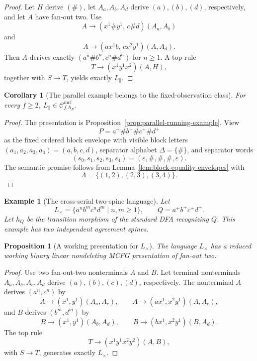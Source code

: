 \documentclass[11pt,a4paper]{article}
\newtheorem{proposition}[theorem]{Proposition}
\newtheorem{corollary}[theorem]{Corollary}
\newtheorem{example}[theorem]{Example}
\theoremstyle{remark}
\newcommand{\Cmcf}[2]{\mathcal{C}^{\mathrm{mcf}}_{#1,#2}}
\newcommand{\eps}{\varepsilon}
\begin{document}
\begin{proof}
Let \(H\) derive \((\#)\), let \(A_a,A_b,A_d\) derive \((a),(b),(d)\),
respectively, and let \(A\) have fan-out two.  Use
\[
  A\to(x^1\#y^1,\,c\#d)(A_a,A_b)
\]
and
\[
  A\to(a x^1 b,\,c x^2 y^1)(A,A_d).
\]
Then \(A\) derives exactly \((a^n\#b^n,c^n\#d^n)\) for \(n\ge1\).  A top rule
\[
  T\to(x^1y^1x^2)(A,H),
\]
together with \(S\to T\), yields exactly \(L_{\parallel}\).
\end{proof}

\begin{corollary}[The parallel example belongs to the fixed-observation class]
\label{cor:parallel-in-fixed-observation-class}
For every \(f\ge2\), \(L_{\parallel}\in\Cmcf{f}{h_P}\).
\end{corollary}

\begin{proof}
The presentation is Proposition~\ref{prop:parallel-running-example}.  View
\[
  P=a^+\#b^+\#c^+\#d^+
\]
as the fixed ordered block envelope with visible block letters
\((a_1,a_2,a_3,a_4)=(a,b,c,d)\), separator alphabet
\(\Delta=\{\#\}\), and separator words
\[
  (s_0,s_1,s_2,s_3,s_4)=(\eps,\#,\#,\#,\eps).
\]
The semantic promise follows from
Lemma~\ref{lem:block-equality-envelopes} with
\[
  \Lambda=\{(1,2),(2,3),(3,4)\}.
\]
\end{proof}

\begin{example}[The cross-serial two-spine language]
\label{ex:cross-serial-language}
Let
\[
  L_{\times}=\{a^n b^m c^n d^m\mid n,m\ge1\},
  \qquad Q=a^+b^+c^+d^+ .
\]
Let \(h_Q\) be the transition morphism of the standard DFA recognizing \(Q\).
This example has two independent agreement spines.
\end{example}

\begin{proposition}[A working presentation for \(L_{\times}\)]
\label{prop:cross-serial-running-example}
The language \(L_{\times}\) has a reduced working binary linear nondeleting MCFG
presentation of fan-out two.
\end{proposition}

\begin{proof}
Use two fan-out-two nonterminals \(A\) and \(B\).  Let terminal nonterminals
\(A_a,A_b,A_c,A_d\) derive \((a),(b),(c),(d)\), respectively.  The nonterminal
\(A\) derives \((a^n,c^n)\) by
\[
  A\to(x^1,y^1)(A_a,A_c),
  \qquad
  A\to(a x^1,x^2 y^1)(A,A_c),
\]
and \(B\) derives \((b^m,d^m)\) by
\[
  B\to(x^1,y^1)(A_b,A_d),
  \qquad
  B\to(b x^1,x^2 y^1)(B,A_d).
\]
The top rule
\[
  T\to(x^1y^1x^2y^2)(A,B),
\]
with \(S\to T\), generates exactly \(L_{\times}\).
\end{proof}
\end{document}
